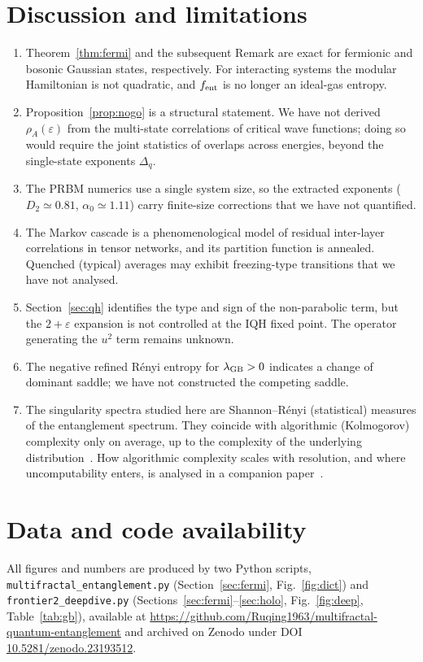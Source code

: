 \documentclass[11pt]{article}
\theoremstyle{definition}\newtheorem{definition}{Definition}[section]
\theoremstyle{remark}\newtheorem*{remark}{Remark}
\begin{document}
\section{Discussion and limitations}
\label{sec:discussion}
\begin{enumerate}
\item Theorem~\ref{thm:fermi} and the subsequent Remark are exact for fermionic and bosonic Gaussian states, respectively. For interacting systems the modular
Hamiltonian is not quadratic, and $f_{\rm ent}$ is no longer an ideal-gas entropy.
\item Proposition~\ref{prop:nogo} is a structural statement. We have not derived $\rho_A(\varepsilon)$ from the
multi-state correlations of critical wave functions; doing so would require the joint statistics of
overlaps across energies, beyond the single-state exponents $\Delta_q$.
\item The PRBM numerics use a single system size, so the extracted exponents ($D_2\simeq0.81$, $\alpha_0\simeq1.11$)
carry finite-size corrections that we have not quantified.
\item The Markov cascade is a phenomenological model of residual inter-layer correlations in tensor
networks, and its partition function is annealed. Quenched (typical) averages may exhibit freezing-type
transitions that we have not analysed.
\item Section~\ref{sec:qh} identifies the type and sign of the non-parabolic term, but the $2+\varepsilon$
expansion is not controlled at the IQH fixed point. The operator generating the $u^2$ term remains unknown.
\item The negative refined R\'enyi entropy for $\lambda_{\rm GB}>0$ indicates a change of dominant saddle; we have not
constructed the competing saddle.
\item The singularity spectra studied here are Shannon--R\'enyi (statistical) measures of the entanglement
spectrum. They coincide with algorithmic (Kolmogorov) complexity only on average, up to the complexity of the
underlying distribution~\cite{LiVitanyiMQE}. How algorithmic complexity scales with resolution, and where
uncomputability enters, is analysed in a companion paper~\cite{Chen2026_chaitin}.
\end{enumerate}

\section*{Data and code availability}
All figures and numbers are produced by two Python scripts, \texttt{multifractal\_entanglement.py}
(Section~\ref{sec:fermi}, Fig.~\ref{fig:dict}) and \texttt{frontier2\_deepdive.py} (Sections~\ref{sec:fermi}--\ref{sec:holo},
Fig.~\ref{fig:deep}, Table~\ref{tab:gb}), available at
\url{https://github.com/Ruqing1963/multifractal-quantum-entanglement} and archived on Zenodo under DOI
\href{https://doi.org/10.5281/zenodo.23193512}{10.5281/zenodo.23193512}.
\end{document}
